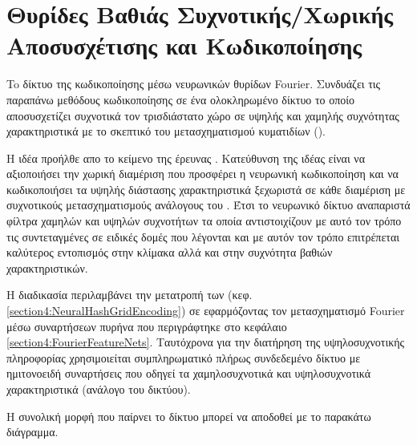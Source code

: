 \section{Θυρίδες Βαθιάς Συχνοτικής/Χωρικής Αποσυσχέτισης και Κωδικοποίησης}
\par
    To δίκτυο της  κωδικοποίησης μέσω νευρωνικών θυρίδων Fourier. Συνδυάζει τις παραπάνω μεθόδους κωδικοποίησης σε ένα ολοκληρωμένο δίκτυο το οποίο αποσυσχετίζει συχνοτικά τον τρισδιάστατο χώρο σε υψηλής και χαμηλής συχνότητας χαρακτηριστικά με το σκεπτικό του μετασχηματισμού κυματιδίων (). 
\par    
    Η ιδέα προήλθε απο το κείμενο της έρευνας  \cite{wu2023neural}. Κατεύθυνση της ιδέας είναι να αξιοποιήσει την χωρική διαμέριση που προσφέρει η νευρωνική κωδικοποίηση  και να κωδικοποιήσει τα υψηλής διάστασης χαρακτηριστικά ξεχωριστά σε κάθε διαμέριση με συχνοτικούς μετασχηματισμούς ανάλογους του . Έτσι το νευρωνικό δίκτυο αναπαριστά φίλτρα χαμηλών και υψηλών συχνοτήτων τα οποία αντιστοιχίζουν με αυτό τον τρόπο τις συντεταγμένες σε ειδικές δομές που λέγονται  και με αυτόν τον τρόπο επιτρέπεται καλύτερος εντοπισμός στην κλίμακα αλλά και στην συχνότητα βαθιών  χαρακτηριστικών. 
\par
    H διαδικασία περιλαμβάνει την μετατροπή των   (κεφ.\ref{section4:NeuralHashGridEncoding}) σε  εφαρμόζοντας τον μετασχηματισμό Fourier  μέσω συναρτήσεων πυρήνα που περιγράφτηκε στο κεφάλαιο \ref{section4:FourierFeatureNets}. 
    Ταυτόχρονα για την διατήρηση της υψηλοσυχνοτικής πληροφορίας χρησιμοιείται συμπληρωματικό πλήρως συνδεδεμένο δίκτυο με ημιτονοειδή συναρτήσεις που οδηγεί τα χαμηλοσυχνοτικά και υψηλοσυχνοτικά χαρακτηριστικά (ανάλογο του  δικτύου). 
    \clearpage
\par 
    Η συνολική μορφή που παίρνει το δίκτυο   μπορεί να αποδοθεί με το παρακάτω διάγραμμα. 
